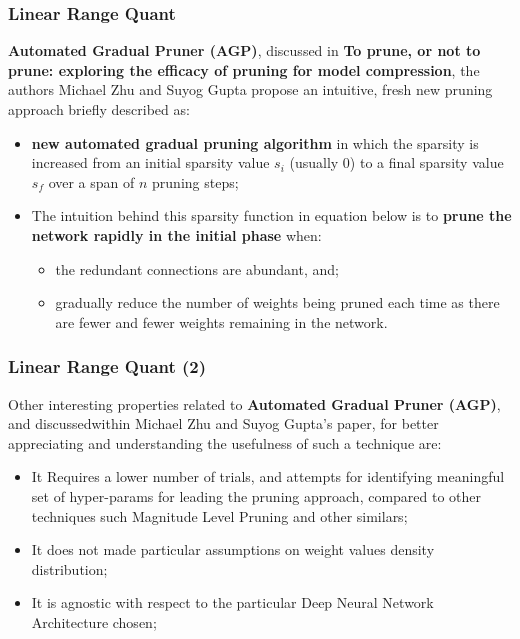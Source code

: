 



\begin{frame}
\frametitle{Linear Range Quant}
\textbf{Automated Gradual Pruner (AGP)}, discussed in \textbf{To prune, or not to prune: exploring the efficacy of pruning for model compression}, the authors Michael Zhu and Suyog Gupta propose an intuitive, fresh new pruning approach briefly described as:

\begin{itemize}
\item \textbf{new automated gradual pruning algorithm} in which the sparsity is increased from an initial sparsity value $s_{i}$ (usually 0) to a ﬁnal sparsity value $s_{f}$ over a span of $n$ pruning steps;
\item The intuition behind this sparsity function in equation below is to \textbf{prune the network rapidly in the initial phase} when:
\begin{itemize}
\item the redundant connections are abundant, and;
\item gradually reduce the number of weights being pruned each time as there are fewer and fewer weights remaining in the network.
\end{itemize}
\end{itemize}



\end{frame}

\begin{frame}
\frametitle{Linear Range Quant (2)}
Other interesting properties related to \textbf{Automated Gradual Pruner (AGP)}, and discussedwithin Michael Zhu and Suyog Gupta's paper, for better appreciating and understanding the usefulness of such a technique are:

\begin{itemize}
\item It Requires a lower number of trials, and attempts for identifying meaningful set of hyper-params for leading the pruning approach, compared to other techniques such Magnitude Level Pruning and other similars;
\item It does not made particular assumptions on weight values density distribution;
\item It is agnostic with respect to the particular Deep Neural Network Architecture chosen;
\end{itemize}



\end{frame}

